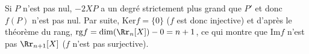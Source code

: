 {\begin{enumerate}
{Si $P$ n'est pas nul, $-2XP$ a un degré strictement plus grand que $P'$ et donc $f(P)$ n'est pas nul. Par suite, $\mbox{Ker}f=\{0\}$ ($f$ est donc injective) et d'après le théorème du rang, $\mbox{rg}f=\mbox{dim}(\Rr_n[X])-0=n+1$, ce qui montre que $\mbox{Im}f$ n'est pas $\Rr_{n+1}[X]$ ($f$ n'est pas surjective).}
\end{enumerate}
}
